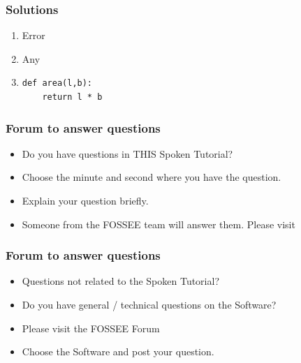 \documentclass[17pt]{beamer}
\begin{document}
\begin{frame}[fragile]
\frametitle{Solutions}
\label{sec-18}


\begin{enumerate}
\item Error
\vspace{16pt}
\item Any
\vspace{12pt}
\item \lstset{language=Python}
\begin{lstlisting}
def area(l,b):
    return l * b
\end{lstlisting}
\end{enumerate}
\end{frame}
\begin{frame}
\frametitle{Forum to answer questions}
\begin{itemize}
\item Do you have questions in THIS Spoken Tutorial?
\item Choose the minute and second where you have the question.
\item Explain your question briefly.
\item Someone from the FOSSEE team will answer them. Please visit 
\end{itemize}
\begin{center}
{\color{blue}{http://forums.spoken-tutorial.org/}}
 \end{center} 
\end{frame}
\begin{frame}
\frametitle{Forum to answer questions}
\begin{itemize}
\item Questions not related to the Spoken Tutorial?
\item Do you have general / technical questions on the Software?
\item Please visit the FOSSEE Forum
\begin{center}
{\color{blue}{http://forums.fossee.in/}}
 \end{center}
\item Choose the Software and post your question.
\end{itemize}
\end{frame}
\end{document}
